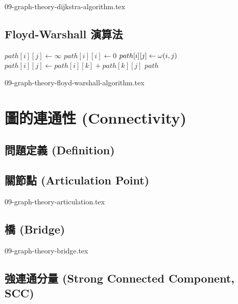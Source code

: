 \documentclass[12pt,a4paper,oneside]{report}
\begin{document}
\begin{CJK}{UTF8}{bkai}
{09-graph-theory-dijkstra-algorithm.tex}

\subsection{Floyd-Warshall 演算法}
\begin{algorithm}
\caption{Floyd Warshall 演算法}
\label{algo:shortest_path_floyd_warshall}
\begin{algorithmic}[1]
  \State{}
        \State $path[i][j]\gets{\infty}$
      \Else
        \State $path[i][i]\gets{0}$
      \EndIf
    \EndFor
  \EndFor
    \State $path[i][j]\gets{\omega{\ensuremath{({i},{j})}}}$
  \EndFor
          \State $path[i][j]\gets{path[i][k]+path[k][j]}$
        \EndIf
      \EndFor
    \EndFor
  \EndFor
  \State \Return $path$
\EndProcedure
\end{algorithmic}
\end{algorithm}

{09-graph-theory-floyd-warshall-algorithm.tex}

\section{圖的連通性 (Connectivity)}
\subsection{問題定義 (Definition)}
\subsection{關節點 (Articulation Point)}

{09-graph-theory-articulation.tex}

\subsection{橋 (Bridge)}

{09-graph-theory-bridge.tex}

\subsection{強連通分量 (Strong Connected Component, SCC)}

\end{CJK}
\end{document}
